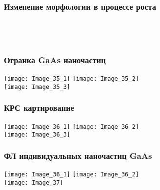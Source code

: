 \begin{frame}
	\frametitle{Изменение морфологии в процессе роста}
	\centering
	\begin{columns}[onlytextwidth]
		\begin{column}{0.48\textwidth}
			\centering
			\\[10pt]
			\begin{minipage}[t]{0.47\linewidth}
			\end{minipage}
			\begin{minipage}[t]{0.47\linewidth}
			\end{minipage}
		\end{column}
		\begin{column}{0.47\textwidth}
			\centering
			\\[10pt]
			\begin{minipage}[t]{0.48\linewidth}
			\end{minipage}
			\begin{minipage}[t]{0.47\linewidth}
			\end{minipage}
		\end{column}
	\end{columns}
\end{frame}

\begin{frame}
	\frametitle{Огранка GaAs наночастиц}
	\centering
	\texttt{[image: Image\_35\_1]}
	\texttt{[image: Image\_35\_2]}
	\\
	\texttt{[image: Image\_35\_3]}
\end{frame}

\begin{frame}
	\frametitle{КРС картирование}
	\centering
	\texttt{[image: Image\_36\_1]}
	\texttt{[image: Image\_36\_2]}
	\\
	\texttt{[image: Image\_36\_3]}
\end{frame}

\begin{frame}
	\frametitle{ФЛ индивидуальных наночастиц GaAs}
	\centering
	\texttt{[image: Image\_36\_1]}
	\texttt{[image: Image\_36\_2]}
	\\
	\texttt{[image: Image\_37]}
\end{frame}

